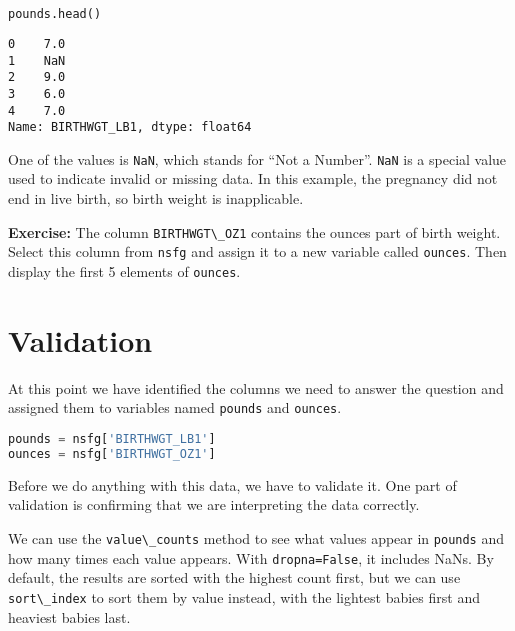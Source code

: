 \begin{lstlisting}[language=Python,style=source]
pounds.head()
\end{lstlisting}

\begin{lstlisting}[style=output]
0    7.0
1    NaN
2    9.0
3    6.0
4    7.0
Name: BIRTHWGT_LB1, dtype: float64
\end{lstlisting}

One of the values is \passthrough{\lstinline!NaN!}, which stands for
``Not a Number''. \passthrough{\lstinline!NaN!} is a special value used
to indicate invalid or missing data. In this example, the pregnancy did
not end in live birth, so birth weight is inapplicable.

\textbf{Exercise:} The column \passthrough{\lstinline!BIRTHWGT\_OZ1!}
contains the ounces part of birth weight. Select this column from
\passthrough{\lstinline!nsfg!} and assign it to a new variable called
\passthrough{\lstinline!ounces!}. Then display the first 5 elements of
\passthrough{\lstinline!ounces!}.

\section{Validation}\label{validation}

At this point we have identified the columns we need to answer the
question and assigned them to variables named
\passthrough{\lstinline!pounds!} and \passthrough{\lstinline!ounces!}.

\begin{lstlisting}[language=Python,style=source]
pounds = nsfg['BIRTHWGT_LB1']
ounces = nsfg['BIRTHWGT_OZ1']
\end{lstlisting}

Before we do anything with this data, we have to validate it. One part
of validation is confirming that we are interpreting the data correctly.

\pagebreak

We can use the \passthrough{\lstinline!value\_counts!} method to see
what values appear in \passthrough{\lstinline!pounds!} and how many
times each value appears. With \passthrough{\lstinline!dropna=False!},
it includes NaNs. By default, the results are sorted with the highest
count first, but we can use \passthrough{\lstinline!sort\_index!} to
sort them by value instead, with the lightest babies first and heaviest
babies last.

